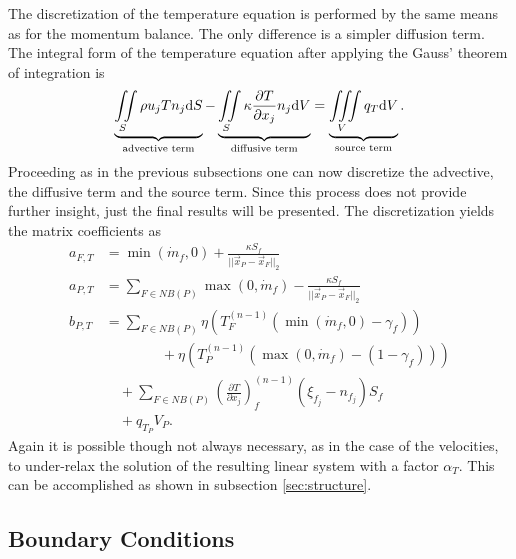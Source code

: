     The discretization of the temperature equation is performed by the same means as for the momentum balance. The only difference is a simpler diffusion term. The integral form of the temperature equation after applying the Gauss' theorem of integration is
    \begin{displaymath}
    \underbrace{ \iint\limits_S \rho u_j T n_j \mathrm{d}S }_{\text{advective term}}
    - \underbrace{ \iint\limits_S \kappa \frac{\partial T}{\partial x_j} n_j \mathrm{d}V }_{\text{diffusive term}}
    = \underbrace{\iiint\limits_V \vphantom{\frac{ T}{ x_j} } q_T \mathrm{d}V }_{\text{source term}}.
    \end{displaymath}
    Proceeding as in the previous subsections one can now discretize the advective, the diffusive term and the source term. Since this process does not provide further insight, just the final results will be presented. The discretization yields the matrix coefficients as
    \begin{subequations}
      \begin{align}
        a_{F,T} &= \min(\dot{m}_f,0) + \frac{\kappa S_f}{||\vec{x}_P - \vec{x}_F||_2} \\[1em]
        a_{P,T} &= \sum_{F \in NB(P)}\max(0,\dot{m}_f) - \frac{\kappa S_f}{||\vec{x}_P - \vec{x}_F||_2} \\[1em]
        b_{P,T} &= \sum_{F \in NB(P)} \eta  \left(T_F^{(n-1)} \left( \min(\dot{m}_f,0) - \gamma_f \right)\right) \nonumber \\
                &\quad \quad \quad  \quad+ \eta \left( T_{P}^{(n-1)} \left( \max(0,\dot{m}_f) - \left(1 - \gamma_f\right) \right)\right) \nonumber \\[0.5em]
                &\quad + \sum_{F \in NB(P)} \left( \frac{\partial T}{\partial x_j}\right)_f^{(n-1)} \left(\xi_{f_j} - n_{f_j}\right)S_f \nonumber \\[0.5em]
                &\quad + q_{T_P} V_P.
      \end{align}
    \end{subequations}
    Again it is possible though not always necessary, as in the case of the velocities, to under-relax the solution of the resulting linear system with a factor \(\alpha_T\). This can be accomplished as shown in subsection \ref{sec:structure}.

  \subsection{Boundary Conditions}
  \label{sec:segboundary}

